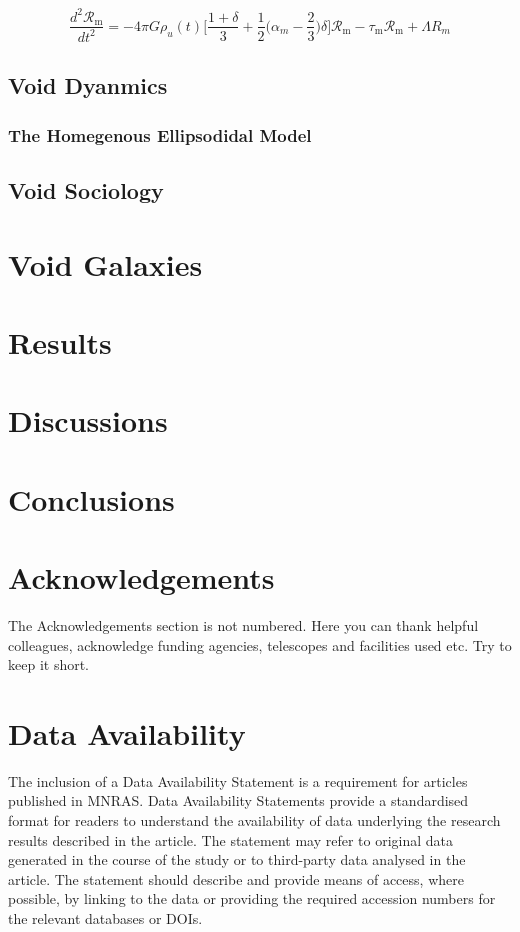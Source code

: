 \documentclass[fleqn,usenatbib]{mnras}
\begin{document}
\begin{equation}
	\dfrac{d^2 \mathcal{R}_\textrm{m}}{dt^2} = -4 \pi G \rho_u (t) \Bigg[\dfrac{1+\delta}{3} + \dfrac{1}{2}\Big(\alpha_m - \dfrac{2}{3} \Big)\delta \Bigg] \mathcal{R}_\textrm{m} - \tau_\textrm{m} \mathcal{R}_\textrm{m} + \Lambda R_m
\end{equation}

\subsection{Void Dyanmics}
\subsubsection{The Homegenous Ellipsodidal Model}
\subsection{Void Sociology}


\section{Void Galaxies}
\section{Results}
\section{Discussions}
\section{Conclusions}
\section*{Acknowledgements}

The Acknowledgements section is not numbered. Here you can thank helpful
colleagues, acknowledge funding agencies, telescopes and facilities used etc.
Try to keep it short.

\section*{Data Availability}

 
The inclusion of a Data Availability Statement is a requirement for articles published in MNRAS. Data Availability Statements provide a standardised format for readers to understand the availability of data underlying the research results described in the article. The statement may refer to original data generated in the course of the study or to third-party data analysed in the article. The statement should describe and provide means of access, where possible, by linking to the data or providing the required accession numbers for the relevant databases or DOIs.
\end{document}
